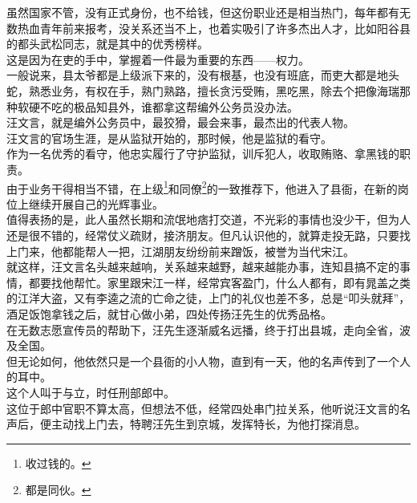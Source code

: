 \begin{multicols}{\theparacolNo}
虽然国家不管，没有正式身份，也不给钱，但这份职业还是相当热门，每年都有无数热血青年前来报考，没关系还当不上，也着实吸引了许多杰出人才，比如阳谷县的都头武松同志，就是其中的优秀榜样。\\

这是因为在吏的手中，掌握着一件最为重要的东西——权力。\\

一般说来，县太爷都是上级派下来的，没有根基，也没有班底，而吏大都是地头蛇，熟悉业务，有权在手，熟门熟路，擅长贪污受贿，黑吃黑，除去个把像海瑞那种软硬不吃的极品知县外，谁都拿这帮编外公务员没办法。\\

汪文言，就是编外公务员中，最狡猾，最会来事，最杰出的代表人物。\\

汪文言的官场生涯，是从监狱开始的，那时候，他是监狱的看守。\\

作为一名优秀的看守，他忠实履行了守护监狱，训斥犯人，收取贿赂、拿黑钱的职责。\\

由于业务干得相当不错，在上级\footnote{收过钱的。}和同僚\footnote{都是同伙。}的一致推荐下，他进入了县衙，在新的岗位上继续开展自己的光辉事业。\\

值得表扬的是，此人虽然长期和流氓地痞打交道，不光彩的事情也没少干，但为人还是很不错的，经常仗义疏财，接济朋友。但凡认识他的，就算走投无路，只要找上门来，他都能帮人一把，江湖朋友纷纷前来蹭饭，被誉为当代宋江。\\

就这样，汪文言名头越来越响，关系越来越野，越来越能办事，连知县搞不定的事情，都要找他帮忙。家里跟宋江一样，经常宾客盈门，什么人都有，即有晁盖之类的江洋大盗，又有李逵之流的亡命之徒，上门的礼仪也差不多，总是“叩头就拜”，酒足饭饱拿钱之后，就甘心做小弟，四处传扬汪先生的优秀品格。\\

在无数志愿宣传员的帮助下，汪先生逐渐威名远播，终于打出县城，走向全省，波及全国。\\

但无论如何，他依然只是一个县衙的小人物，直到有一天，他的名声传到了一个人的耳中。\\

这个人叫于与立，时任刑部郎中。\\

这位于郎中官职不算太高，但想法不低，经常四处串门拉关系，他听说汪文言的名声后，便主动找上门去，特聘汪先生到京城，发挥特长，为他打探消息。\\


\end{multicols}

